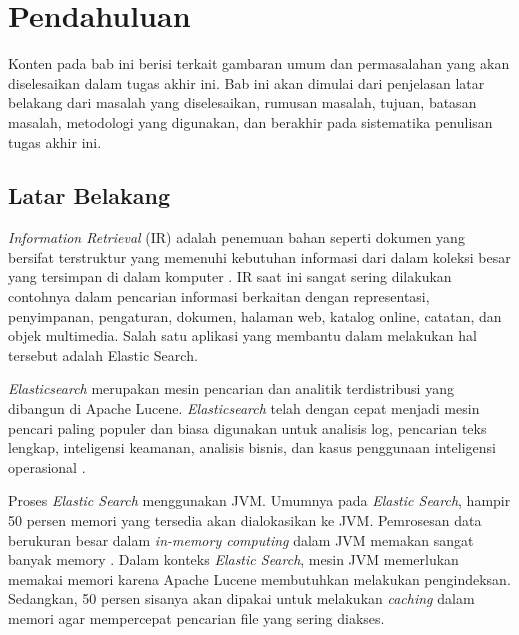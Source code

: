 \chapter{Pendahuluan}

Konten pada bab ini berisi terkait gambaran umum dan permasalahan yang akan diselesaikan dalam tugas akhir ini. Bab ini akan dimulai dari penjelasan latar belakang dari masalah yang diselesaikan, rumusan masalah, tujuan, batasan masalah, metodologi yang digunakan, dan berakhir pada sistematika penulisan tugas akhir ini.

\section{Latar Belakang}


\textit{Information Retrieval} (IR) adalah penemuan bahan seperti dokumen yang bersifat terstruktur yang memenuhi kebutuhan informasi dari dalam koleksi besar yang tersimpan di dalam komputer \parencite{introtoinforetri}. IR saat ini sangat sering dilakukan contohnya dalam pencarian informasi berkaitan dengan representasi, penyimpanan, pengaturan, dokumen, halaman web, katalog online, catatan, dan objek multimedia. Salah satu aplikasi yang membantu dalam melakukan hal tersebut adalah Elastic Search.

\textit{Elasticsearch} merupakan mesin pencarian dan analitik terdistribusi yang dibangun di Apache Lucene. \textit{Elasticsearch} telah dengan cepat menjadi mesin pencari paling populer dan biasa digunakan untuk analisis log, pencarian teks lengkap, inteligensi keamanan, analisis bisnis, dan kasus penggunaan inteligensi operasional \parencite{elasticsearch}.

Proses \textit{Elastic Search} menggunakan JVM. Umumnya pada \textit{Elastic Search}, hampir 50 persen memori yang tersedia akan dialokasikan ke JVM. Pemrosesan data berukuran besar dalam \textit{in-memory computing} dalam JVM memakan sangat banyak memory \parencite{jvm}. Dalam konteks \textit{Elastic Search}, mesin JVM memerlukan memakai memori karena Apache Lucene membutuhkan melakukan pengindeksan. Sedangkan, 50 persen sisanya akan dipakai untuk melakukan \textit{caching} dalam memori agar mempercepat pencarian file yang sering diakses.

